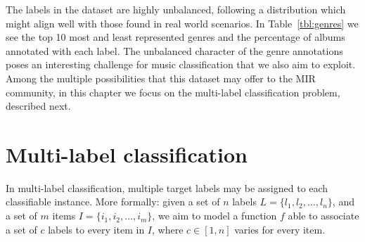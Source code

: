 The labels in the dataset are highly unbalanced, following a distribution which might align well with those found in real world scenarios. 
In Table~\ref{tbl:genres} we see the top 10 most and least represented genres and the percentage of albums annotated with each label.
The unbalanced character of the genre annotations poses an interesting challenge for music classification that we also aim to exploit. 
Among the multiple possibilities that this dataset may offer to the MIR community, in this chapter we focus on the multi-label classification problem, described next.



\section{Multi-label classification}\label{sec:multi-class:multilabel}


In multi-label classification, multiple target labels may be assigned to each classifiable instance. %
More formally: given a set of $n$ labels $L = \{l_1,l_2,\ldots,l_n\}$, and a set of $m$ items $I = \{i_1,i_2,\ldots,i_m\}$, we aim to model a function $f$ able to associate a set of $c$ labels to every item in $I$, where $c \in [1, n]$ varies for every item. %

